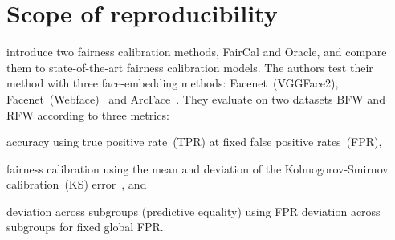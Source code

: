 \section{Scope of reproducibility}
\label{sec:claims}


\citeauthor{salvador2022faircal} 
introduce two fairness calibration methods, FairCal and Oracle, and compare them to state-of-the-art fairness calibration models.
The authors test their method with three face-embedding methods: Facenet~(VGGFace2), Facenet~(Webface)~\cite{facenetpytorch} and Arc\-Face~\cite{salvador_2021arcface}.
They evaluate on two datasets BFW \cite{DBLP:journals/corr/abs-2002-06483bfw} and RFW \cite{Wang_2019_ICCVrfw1,wang2021metarfw2,wang2019skewnessrfw3,wang2018deeprfw4} according to three metrics: 
\begin{enumerate*}[label=(\roman*)]
    \item accuracy using true positive rate~(TPR) at fixed false positive rates~(FPR),
    \item fairness calibration using the mean and deviation of the Kolmogorov-Smirnov calibration~(KS) error~\cite{gupta2021calibration}, and
    \item deviation across subgroups (predictive equality) using FPR deviation across subgroups for fixed global FPR.
\end{enumerate*}




